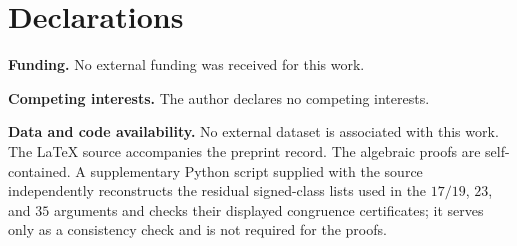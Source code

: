 \documentclass[11pt]{amsart}
\theoremstyle{definition}
\theoremstyle{remark}
\begin{document}
\section*{Declarations}
\textbf{Funding.} No external funding was received for this work.

\textbf{Competing interests.} The author declares no competing interests.

\textbf{Data and code availability.} No external dataset is associated
with this work.  The LaTeX source accompanies the preprint record.  The
algebraic proofs are self-contained.  A supplementary Python script supplied
with the source independently reconstructs the residual signed-class lists
used in the $17/19$, $23$, and $35$ arguments and checks their displayed
congruence certificates; it serves only as a consistency check and is not
required for the proofs.

\appendix







\printbibliography
\end{document}
